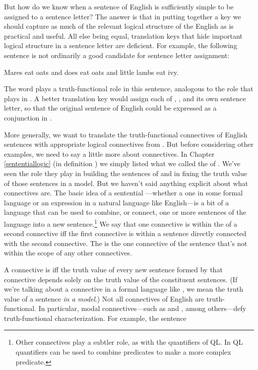 But how do we know when a sentence of English is sufficiently simple to be assigned to a sentence letter?  The answer is that in putting together a key we should capture as much of the relevant logical structure of the English as is practical and useful.  All else being equal, translation keys that hide important logical structure in a sentence letter are deficient.  For example, the following sentence is not ordinarily a good candidate for sentence letter assignment:

\begin{smenumerate}
	\item Mares eat oats and does eat oats and little lambs eat ivy.
\end{smenumerate}

\noindent{}The word  plays a truth-functional role in this sentence, analogous to the role that \mention{$\WEDGE$} plays in \GSL{}.  A better translation key would assign each of , , and  its own sentence letter, so that the original sentence of English could be expressed as a conjunction in \GSL{}.

More generally, we want to translate the truth-functional connectives of English sentences with appropriate logical connectives from \GSL{}. 
But before considering other examples, we need to say a little more about connectives. 
In Chapter \ref{sententiallogic} (in definition ) we simply listed what we called the  of \GSL{}.  We've seen the role they play in building the sentences of \GSL{} and in fixing the truth value of those sentences in a model. 
But we haven't said anything explicit about what connectives are. 
The basic idea of a sentential ---whether a  one in some formal language or an expression in a natural language like English---is a bit of a language that can be used to combine, or connect, one or more sentences of the language into a new sentence.\footnote{Other connectives play a subtler role, as with the quantifiers of QL.  In QL quantifiers can be used to combine predicates to make a more complex predicate.} 
We say that one connective is within the  of a second connective iff the first connective is within a sentence directly connected with the second connective.  The  is the one connective of the sentence that's not within the scope of any other connectives. 

A connective is  iff the truth value of every new sentence formed by that connective depends solely on the truth value of the constituent sentences. 
(If we're talking about a connective in a formal language like \GSL{}, we mean the truth value of a sentence \emph{in a model}.)
Not all connectives of English are truth-functional. In particular, modal connectives---such as  and , among others---defy truth-functional characterization.  For example, the sentence

